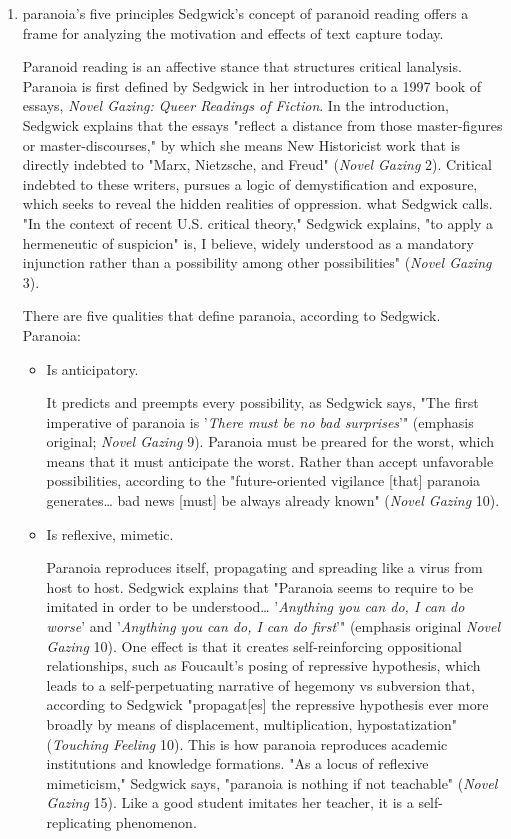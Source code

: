 \documentclass[11pt]{article}
\begin{document}
\begin{enumerate}
\item paranoia's five principles
\label{sec:orgbaf05c1}
Sedgwick's concept of paranoid reading offers a frame for analyzing
the motivation and effects of text capture today.

Paranoid reading is an affective stance that structures critical
lanalysis. Paranoia is first defined by Sedgwick in her introduction
to a 1997 book of essays, \emph{Novel Gazing: Queer Readings of Fiction}.
In the introduction, Sedgwick explains that the essays "reflect a
distance from those master-figures or master-discourses," by which she
means New Historicist work that is directly indebted to "Marx,
Nietzsche, and Freud" (\emph{Novel Gazing} 2). Critical indebted to these
writers, pursues a logic of demystification and exposure, which seeks
to reveal the hidden realities of oppression. what Sedgwick calls. "In
the context of recent U.S. critical theory," Sedgwick explains, "to
apply a hermeneutic of suspicion" is, I believe, widely understood as
a mandatory injunction rather than a possibility among other
possibilities" (\emph{Novel Gazing} 3).

There are five qualities that define paranoia, according to Sedgwick.
Paranoia:

\begin{itemize}
\item Is anticipatory.

It predicts and preempts every possibility, as Sedgwick says, "The
first imperative of paranoia is '\emph{There must be no bad surprises}'"
(emphasis original; \emph{Novel Gazing} 9). Paranoia must be preared for
the worst, which means that it must anticipate the worst. Rather
than accept unfavorable possibilities, according to the
"future-oriented vigilance [that] paranoia generates\ldots{} bad news
[must] be always already known" (\emph{Novel Gazing} 10).

\item Is reflexive, mimetic.

Paranoia reproduces itself, propagating and spreading like a virus
from host to host. Sedgwick explains that "Paranoia seems to require
to be imitated in order to be understood\ldots{} '\emph{Anything you can do, I
can do worse}' and '\emph{Anything you can do, I can do first}'"
(emphasis original \emph{Novel Gazing} 10). One effect is that it creates
self-reinforcing oppositional relationships, such as Foucault's
posing of repressive hypothesis, which leads to a self-perpetuating
narrative of hegemony vs subversion that, according to Sedgwick
"propagat[es] the repressive hypothesis ever more broadly by means
of displacement, multiplication, hypostatization" (\emph{Touching
Feeling} 10). This is how paranoia reproduces academic institutions
and knowledge formations. "As a locus of reflexive mimeticism,"
Sedgwick says, "paranoia is nothing if not teachable" (\emph{Novel
Gazing} 15). Like a good student imitates her teacher, it is a
self-replicating phenomenon.


\end{itemize}
\end{enumerate}
\end{document}
